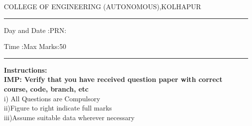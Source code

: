 \documentclass[12pt]{article}
\begin{document}
	\par
	COLLEGE OF ENGINEERING (AUTONOMOUS),KOLHAPUR
	\par\noindent\rule{\textwidth}{0.4pt}
	
	\par
	\par
	\par
	\begin{flushleft}
		Day and Date :{}\hspace{5.5cm}PRN:
	\end{flushleft}
	
	\begin{flushleft}
		Time :{}\hspace{7cm}Max Marks:{50}\\
	\end{flushleft}
	\noindent\rule{\textwidth}{0.1pt}
\begin{flushleft}
	{\bf Instructions:}\\
	{\hspace{0.5cm} \bf IMP: Verify that you have received question paper with correct course, code, branch, etc}\\
	\hspace{1cm}i) All Questions are Compulsory\\
	\hspace{1cm}ii)Figure to right indicate full marks\\
	\hspace{1cm}iii)Assume suitable data wherever necessary\\
\end{flushleft}
\end{document}
